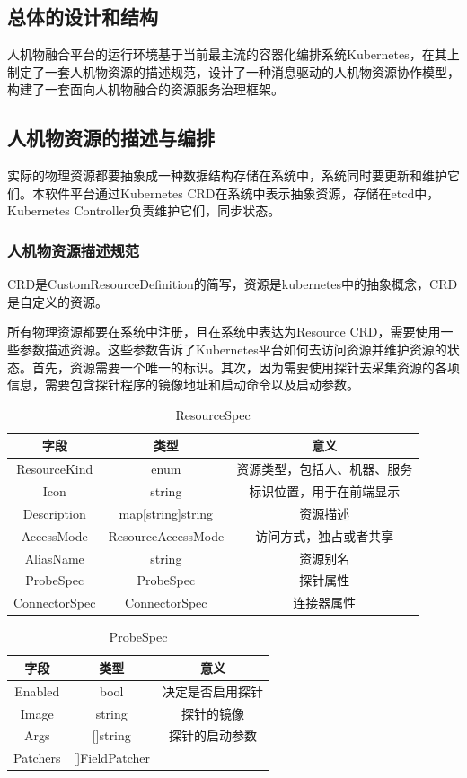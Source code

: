 \documentclass[12pt,a4paper]{article}
\begin{document}
\subsection{总体的设计和结构}

人机物融合平台的运行环境基于当前最主流的容器化编排系统Kubernetes，在其上制定了一套人机物资源的描述规范，设计了一种消息驱动的人机物资源协作模型，构建了一套面向人机物融合的资源服务治理框架。

\subsection{人机物资源的描述与编排}
  实际的物理资源都要抽象成一种数据结构存储在系统中，系统同时要更新和维护它们。本软件平台通过Kubernetes CRD在系统中表示抽象资源，存储在etcd中，Kubernetes Controller负责维护它们，同步状态。
\subsubsection{人机物资源描述规范}
CRD是CustomResourceDefinition的简写，资源是kubernetes中的抽象概念，CRD是自定义的资源。

所有物理资源都要在系统中注册，且在系统中表达为Resource CRD，需要使用一些参数描述资源。这些参数告诉了Kubernetes平台如何去访问资源并维护资源的状态。首先，资源需要一个唯一的标识。其次，因为需要使用探针去采集资源的各项信息，需要包含探针程序的镜像地址和启动命令以及启动参数。

\begin{table}[!htbp]
\centering
\begin{tabular}{ccc}
  \toprule
  字段& 类型& 意义\\
  \midrule
  ResourceKind& enum& 资源类型，包括人、机器、服务\\
  Icon& string& 标识位置，用于在前端显示\\
  Description& map[string]string& 资源描述\\
  AccessMode& ResourceAccessMode& 访问方式，独占或者共享\\
  AliasName& string& 资源别名\\
  ProbeSpec& ProbeSpec& 探针属性\\
  ConnectorSpec& ConnectorSpec& 连接器属性\\
  \bottomrule
\end{tabular}
\caption{ResourceSpec}
\end{table}

\begin{table}[!htbp]
\centering
\begin{tabular}{ccc}
  \toprule
  字段& 类型& 意义\\
  \midrule
  Enabled& bool& 决定是否启用探针\\
  Image& string& 探针的镜像\\
  Args& []string& 探针的启动参数\\
  Patchers& []FieldPatcher& \\
  \bottomrule
\end{tabular}
\caption{ProbeSpec}
\end{table}
\end{document}
